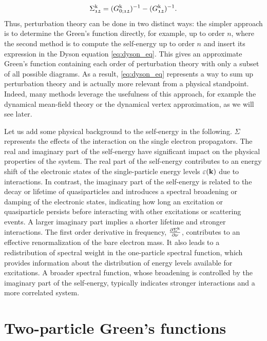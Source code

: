 \documentclass[../../main.tex]{subfiles}
\begin{document}
\begin{align}
	\Sigma_{\mathfrak{12}}^{\text{k}}=(G_{0;\mathfrak{12}}^{\text{k}})^{-1}-(G_{\mathfrak{12}}^{\text{k}})^{-1}.
\end{align}
Thus, perturbation theory can be done in two distinct ways: the simpler approach is to determine the Green's function directly, for example, up to order $n$, where the second method is to compute the self-energy up to order $n$ and insert its expression in the Dyson equation \eqref{eq:dyson_eq}. This gives an approximate Green's function containing each order of perturbation theory with only a subset of all possible diagrams. As a result, \eqref{eq:dyson_eq} represents a way to sum up perturbation theory and is actually more relevant from a physical standpoint. Indeed, many methods leverage the usefulness of this approach, for example the dynamical mean-field theory or the dynamical vertex approximation, as we will see later.

Let us add some physical background to the self-energy in the following. $\Sigma$ represents the effects of the interaction on the single electron propagators. The real and imaginary part of the self-energy have significant impact on the physical properties of the system. The real part of the self-energy contributes to an energy shift of the electronic states of the single-particle energy levels $\varepsilon(\textbf{k})$ due to interactions. In contrast, the imaginary part of the self-energy is related to the decay or lifetime of quasiparticles and introduces a spectral broadening or damping of the electronic states, indicating how long an excitation or quasiparticle persists before interacting with other excitations or scattering events. A larger imaginary part implies a shorter lifetime and stronger interactions. The first order derivative in frequency, $\frac{\partial \Sigma^{\text{k}}}{\partial \nu}$, contributes to an effective renormalization of the bare electron mass. It also leads to a redistribution of spectral weight in the one-particle spectral function, which provides information about the distribution of energy levels available for excitations. A broader spectral function, whose broadening is controlled by the imaginary part of the self-energy, typically indicates stronger interactions and a more correlated system.

\section{Two-particle Green's functions}
\end{document}
